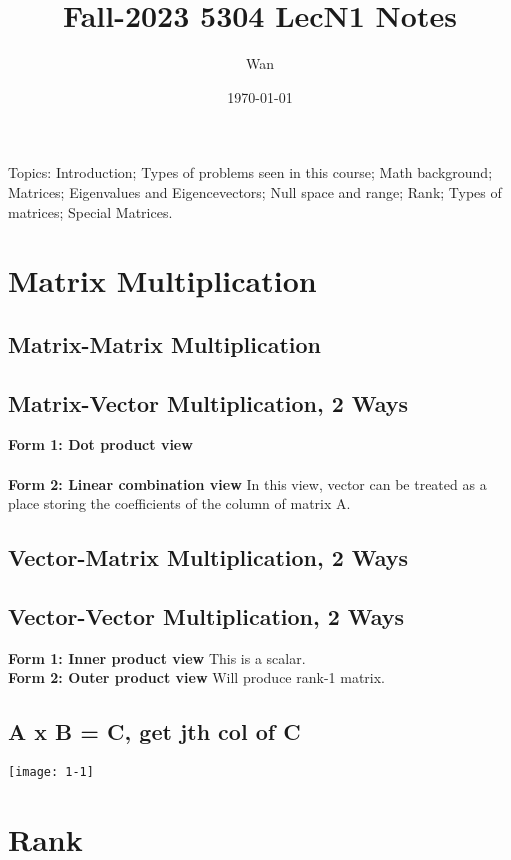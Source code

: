 \documentclass{article}
\begin{document}
\title{Fall-2023 5304 LecN1 Notes}
\author{Wan}
\date{\today}
\maketitle

\noindent
Topics: Introduction; Types of problems seen in this course; Math background;
Matrices; Eigenvalues and Eigencevectors; Null space and range; Rank; Types of matrices;
Special Matrices.

\section{Matrix Multiplication}

\subsection*{Matrix-Matrix Multiplication}


\subsection*{Matrix-Vector Multiplication, 2 Ways}
\textbf{Form 1: Dot product view}\\
\\
\textbf{Form 2: Linear combination view}
In this view, vector can be treated as a place storing the coefficients
of the column of matrix A.


\subsection*{Vector-Matrix Multiplication, 2 Ways}

\subsection*{Vector-Vector Multiplication, 2 Ways}
\textbf{Form 1: Inner product view}
This is a scalar.
\\
\textbf{Form 2: Outer product view}
Will produce rank-1 matrix.

\subsection*{A x B = C, get jth col of C}
\texttt{[image: 1-1]}


\pagebreak
\section{Rank}
\end{document}
